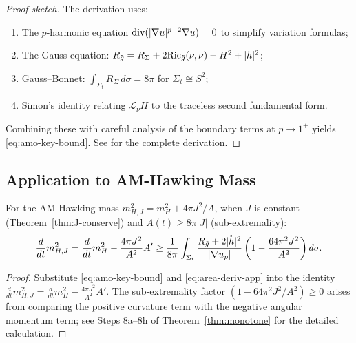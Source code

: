 \begin{proof}[Proof sketch]
The derivation uses:
\begin{enumerate}
    \item The $p$-harmonic equation $\mathrm{div}(|\nabla u|^{p-2}\nabla u) = 0$ to simplify variation formulas;
    \item The Gauss equation: $R_{\tilde{g}} = R_\Sigma + 2\mathrm{Ric}_{\tilde{g}}(\nu,\nu) - H^2 + |h|^2$;
    \item Gauss--Bonnet: $\int_{\Sigma_t} R_\Sigma\,d\sigma = 8\pi$ for $\Sigma_t \cong S^2$;
    \item Simon's identity relating $\mathcal{L}_\nu H$ to the traceless second fundamental form.
\end{enumerate}
Combining these with careful analysis of the boundary terms at $p \to 1^+$ yields \eqref{eq:amo-key-bound}. See \cite[Section~4]{amo2022} for the complete derivation.
\end{proof}

\subsection{Application to AM-Hawking Mass}

\begin{corollary}\label{cor:am-hawking-bound-app}
For the AM-Hawking mass $m_{H,J}^2 = m_H^2 + 4\pi J^2/A$, when $J$ is constant (Theorem~\ref{thm:J-conserve}) and $A(t) \geq 8\pi|J|$ (sub-extremality):
\begin{equation}\label{eq:am-hawking-bound-app}
\frac{d}{dt}m_{H,J}^2 = \frac{d}{dt}m_H^2 - \frac{4\pi J^2}{A^2}A' \geq \frac{1}{8\pi}\int_{\Sigma_t} \frac{R_{\tilde{g}} + 2|\mathring{h}|^2}{|\nabla u_p|}\left(1 - \frac{64\pi^2 J^2}{A^2}\right)d\sigma.
\end{equation}
\end{corollary}

\begin{proof}
Substitute \eqref{eq:amo-key-bound} and \eqref{eq:area-deriv-app} into the identity $\frac{d}{dt}m_{H,J}^2 = \frac{d}{dt}m_H^2 - \frac{4\pi J^2}{A^2}A'$. The sub-extremality factor $(1 - 64\pi^2 J^2/A^2) \geq 0$ arises from comparing the positive curvature term with the negative angular momentum term; see Steps 8a--8h of Theorem~\ref{thm:monotone} for the detailed calculation.
\end{proof}


